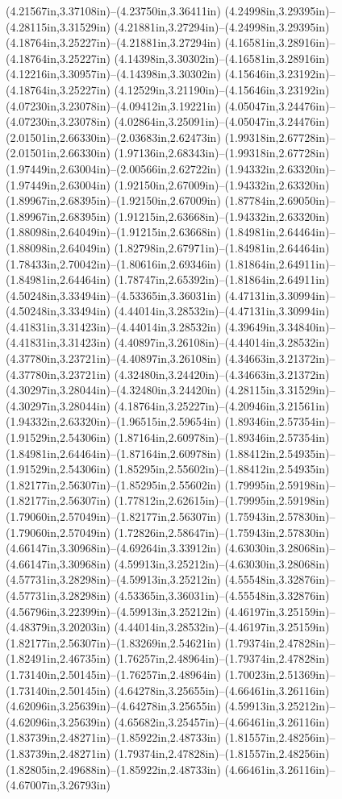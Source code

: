 (4.21567in,3.37108in)--(4.23750in,3.36411in) (4.24998in,3.29395in)--(4.28115in,3.31529in) (4.21881in,3.27294in)--(4.24998in,3.29395in) (4.18764in,3.25227in)--(4.21881in,3.27294in) (4.16581in,3.28916in)--(4.18764in,3.25227in) (4.14398in,3.30302in)--(4.16581in,3.28916in) (4.12216in,3.30957in)--(4.14398in,3.30302in) (4.15646in,3.23192in)--(4.18764in,3.25227in) (4.12529in,3.21190in)--(4.15646in,3.23192in) (4.07230in,3.23078in)--(4.09412in,3.19221in) (4.05047in,3.24476in)--(4.07230in,3.23078in) (4.02864in,3.25091in)--(4.05047in,3.24476in) (2.01501in,2.66330in)--(2.03683in,2.62473in) (1.99318in,2.67728in)--(2.01501in,2.66330in) (1.97136in,2.68343in)--(1.99318in,2.67728in) (1.97449in,2.63004in)--(2.00566in,2.62722in) (1.94332in,2.63320in)--(1.97449in,2.63004in) (1.92150in,2.67009in)--(1.94332in,2.63320in) (1.89967in,2.68395in)--(1.92150in,2.67009in) (1.87784in,2.69050in)--(1.89967in,2.68395in) (1.91215in,2.63668in)--(1.94332in,2.63320in) (1.88098in,2.64049in)--(1.91215in,2.63668in) (1.84981in,2.64464in)--(1.88098in,2.64049in) (1.82798in,2.67971in)--(1.84981in,2.64464in) (1.78433in,2.70042in)--(1.80616in,2.69346in) (1.81864in,2.64911in)--(1.84981in,2.64464in) (1.78747in,2.65392in)--(1.81864in,2.64911in) (4.50248in,3.33494in)--(4.53365in,3.36031in) (4.47131in,3.30994in)--(4.50248in,3.33494in) (4.44014in,3.28532in)--(4.47131in,3.30994in) (4.41831in,3.31423in)--(4.44014in,3.28532in) (4.39649in,3.34840in)--(4.41831in,3.31423in) (4.40897in,3.26108in)--(4.44014in,3.28532in) (4.37780in,3.23721in)--(4.40897in,3.26108in) (4.34663in,3.21372in)--(4.37780in,3.23721in) (4.32480in,3.24420in)--(4.34663in,3.21372in) (4.30297in,3.28044in)--(4.32480in,3.24420in) (4.28115in,3.31529in)--(4.30297in,3.28044in) (4.18764in,3.25227in)--(4.20946in,3.21561in) (1.94332in,2.63320in)--(1.96515in,2.59654in) (1.89346in,2.57354in)--(1.91529in,2.54306in) (1.87164in,2.60978in)--(1.89346in,2.57354in) (1.84981in,2.64464in)--(1.87164in,2.60978in) (1.88412in,2.54935in)--(1.91529in,2.54306in) (1.85295in,2.55602in)--(1.88412in,2.54935in) (1.82177in,2.56307in)--(1.85295in,2.55602in) (1.79995in,2.59198in)--(1.82177in,2.56307in) (1.77812in,2.62615in)--(1.79995in,2.59198in) (1.79060in,2.57049in)--(1.82177in,2.56307in) (1.75943in,2.57830in)--(1.79060in,2.57049in) (1.72826in,2.58647in)--(1.75943in,2.57830in) (4.66147in,3.30968in)--(4.69264in,3.33912in) (4.63030in,3.28068in)--(4.66147in,3.30968in) (4.59913in,3.25212in)--(4.63030in,3.28068in) (4.57731in,3.28298in)--(4.59913in,3.25212in) (4.55548in,3.32876in)--(4.57731in,3.28298in) (4.53365in,3.36031in)--(4.55548in,3.32876in) (4.56796in,3.22399in)--(4.59913in,3.25212in) (4.46197in,3.25159in)--(4.48379in,3.20203in) (4.44014in,3.28532in)--(4.46197in,3.25159in) (1.82177in,2.56307in)--(1.83269in,2.54621in) (1.79374in,2.47828in)--(1.82491in,2.46735in) (1.76257in,2.48964in)--(1.79374in,2.47828in) (1.73140in,2.50145in)--(1.76257in,2.48964in) (1.70023in,2.51369in)--(1.73140in,2.50145in) (4.64278in,3.25655in)--(4.66461in,3.26116in) (4.62096in,3.25639in)--(4.64278in,3.25655in) (4.59913in,3.25212in)--(4.62096in,3.25639in) (4.65682in,3.25457in)--(4.66461in,3.26116in) (1.83739in,2.48271in)--(1.85922in,2.48733in) (1.81557in,2.48256in)--(1.83739in,2.48271in) (1.79374in,2.47828in)--(1.81557in,2.48256in) (1.82805in,2.49688in)--(1.85922in,2.48733in) (4.66461in,3.26116in)--(4.67007in,3.26793in) 